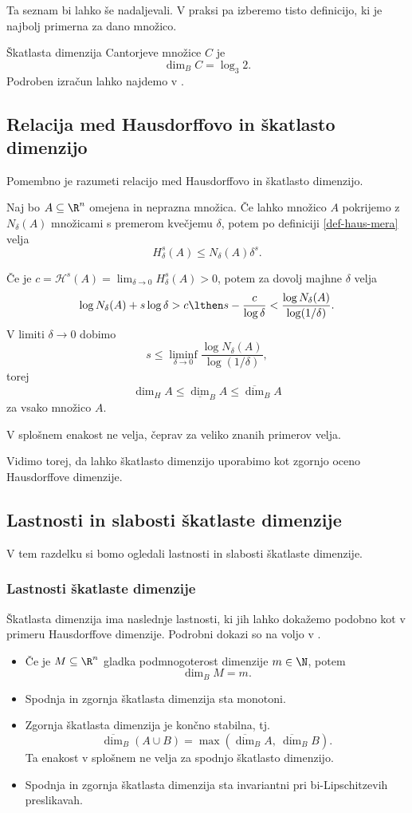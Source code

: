 Ta seznam bi lahko še nadaljevali. V praksi pa izberemo tisto definicijo, ki je najbolj primerna za dano množico.

\begin{zgled}
    Škatlasta dimenzija Cantorjeve množice \(C\) je 
    \[\dim_B C = \log_3 2.\]
    Podroben izračun lahko najdemo v \cite[stran 47]{fk-fg}.
\end{zgled}

\subsection{Relacija med Hausdorffovo in škatlasto dimenzijo}
Pomembno je razumeti relacijo med Hausdorffovo in škatlasto dimenzijo.

Naj bo \(A \subseteq \R^n\) omejena in neprazna množica. Če lahko množico \(A\) pokrijemo z \(N_\delta(A)\) množicami s premerom kvečjemu \(\delta\), potem po definiciji \ref{def-haus-mera} velja
\[
    H^s_\delta(A) \leq N_\delta(A) \delta^s.
\]

Če je \(c = \mathcal{H}^s(A) = \lim_{\delta \to 0} H^s_\delta(A) > 0\), potem za dovolj majhne \(\delta\) velja
\[
    \log N_\delta(A) + s \log \delta > c \lthen s - \frac{c}{\log \delta} < \frac{\log N_\delta(A)}{\log (1 / \delta)}{}.
\]
V limiti \(\delta \to 0\) dobimo
\[
    s \leq \liminf_{\delta \to 0} \frac{\log N_\delta(A)}{\log (1 / \delta)},
\]
torej
\[
    \dim_H A \leq \underline{\dim}_B A \leq \overline{\dim}_B A
\]
za vsako množico \(A\).

V splošnem enakost ne velja, čeprav za veliko znanih primerov velja.

Vidimo torej, da lahko škatlasto dimenzijo uporabimo kot zgornjo oceno Hausdorffove dimenzije.


\subsection{Lastnosti in slabosti škatlaste dimenzije}
V tem razdelku si bomo ogledali lastnosti in slabosti škatlaste dimenzije.

\subsubsection{Lastnosti škatlaste dimenzije}
Škatlasta dimenzija ima naslednje lastnosti, ki jih lahko dokažemo podobno kot v primeru Hausdorffove dimenzije. Podrobni dokazi so na voljo v \cite[stran 47]{fk-fg}.

\begin{itemize}
    \item Če je \(M \subseteq \R^n\) gladka podmnogoterost dimenzije \(m \in \N\), potem 
    \[\dim_B M = m.\]
    \item Spodnja in zgornja škatlasta dimenzija sta monotoni.
    \item Zgornja škatlasta dimenzija je končno stabilna, tj.
    \[\overline{\dim}_B (A \cup B) = \max (\overline{\dim}_B A,\ \overline{\dim}_B  B).\]
    Ta enakost v splošnem ne velja za spodnjo škatlasto dimenzijo.
    \item Spodnja in zgornja škatlasta dimenzija sta invariantni pri bi-Lipschit\-zevih preslikavah.
\end{itemize}

